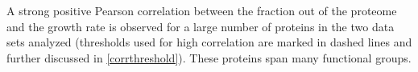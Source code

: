 \label{fig:growthcorr}
A strong positive Pearson correlation between the fraction out of the proteome and the growth rate is observed for a large number of proteins in the two data sets analyzed (thresholds used for high correlation are marked in dashed lines and further discussed in \ref{corrthreshold}).
These proteins span many functional groups.
